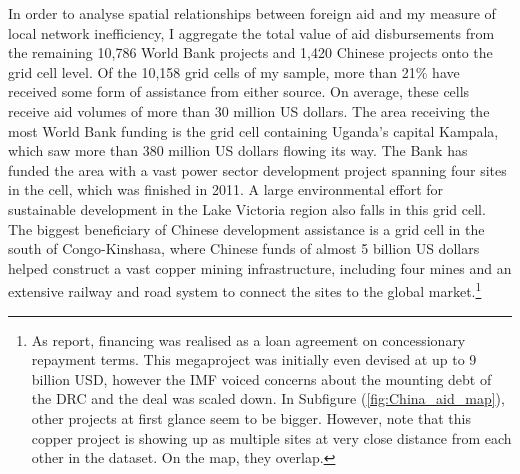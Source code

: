\documentclass[11pt, oneside]{article}   	%
\let\oldref\ref
\renewcommand{\ref}[1]{(\oldref{#1})}
\begin{document}
In order to analyse spatial relationships between foreign aid and my measure of local network inefficiency, I aggregate the total value of aid disbursements from the remaining 10,786 World Bank projects and 1,420 Chinese projects onto the grid cell level. Of the 10,158 grid cells of my sample, more than 21\% have received some form of assistance from either source. On average, these cells receive aid volumes of more than 30 million US dollars. The area receiving the most World Bank funding is the grid cell containing Uganda's capital Kampala, which saw more than 380 million US dollars flowing its way. The Bank has funded the area with a vast power sector development project spanning four sites in the cell, which was finished in 2011. A large environmental effort for sustainable development in the Lake Victoria region also falls in this grid cell. The biggest beneficiary of Chinese development assistance is a grid cell in the south of Congo-Kinshasa, where Chinese funds of almost 5 billion US dollars helped construct a vast copper mining infrastructure, including four mines and an extensive railway and road system to connect the sites to the global market.\footnote{As \cite{Strange_TrackingUnderreportedFinancial_2017} report, financing was realised as a loan agreement on concessionary repayment terms. This megaproject was initially even devised at up to 9 billion USD, however the IMF voiced concerns about the mounting debt of the DRC and the deal was scaled down. In Subfigure \ref{fig:China_aid_map}, other projects at first glance seem to be bigger. However, note that this copper project is showing up as multiple sites at very close distance from each other in the dataset. On the map, they overlap.}
\end{document}
